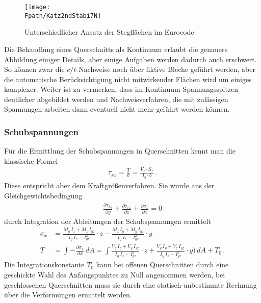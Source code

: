 \begin{figure}[tbp] \centering
\centering
\if {} \sidecaption[t] \fi
\texttt{[image: \\Fpath/Katz2ndStabi7N]}
\caption{Unterschiedlicher Ansatz der Stegfl\"{a}chen im Eurocode} \label{Katz2ndStabi7}
\end{figure}%
Die Behandlung eines Querschnitts als Kontinuum erlaubt die genauere Abbildung einiger Details, aber einige Aufgaben werden dadurch auch erschwert. So k\"{o}nnen zwar die $c/t$-Nachweise noch \"{u}ber fiktive Bleche gef\"{u}hrt werden, aber die automatische Ber\"{u}cksichtigung nicht mitwirkender Fl\"{a}chen wird um einiges komplexer. Weiter ist zu vermerken, dass im Kontinuum Spannungsspitzen deutlicher abgebildet werden und Nachweisverfahren, die mit zul\"{a}ssigen Spannungen arbeiten dann eventuell nicht mehr gef\"{u}hrt werden k\"{o}nnen.
\vspace{-0.5cm}
{\textcolor{sectionTitleBlue}{\subsubsection*{Schubspannungen }}}
F\"{u}r die Ermittlung der Schubspannungen in Querschnitten kennt man die klassische Formel
\begin{align}
\tau_{xz} = \frac{T}{b} = \frac{V_z \cdot S_z}{I_y \cdot b}\,.
\end{align}
Diese entspricht aber dem Kraftgr\"{o}{\ss}enverfahren. Sie wurde aus der Gleichgewichtsbedingung
\begin{align}
\frac{\partial \tau_{xy}}{\partial y} + \frac{\partial \tau_{xz}}{\partial z} + \frac{\partial \sigma_x}{\partial x} = 0
\end{align}
durch Integration der Ableitungen der Schubspannungen ermittelt
\begin{align}
\sigma_{x} &= \frac{M_y\,I_z + M_z\,I_{yz}}{I_y\,I_z - I_{yz}^2} \cdot z - \frac{M_z\,I_y + M_y\,I_{yz}}{I_y\,I_z - I_{yz}^2} \cdot y \\
T &= \int - \frac{ \partial \sigma_x}{\partial x}\,dA = \int\frac{V_z\,I_z + V_y\,I_{yz}}{I_y\,I_z - I_{yz}^2} \cdot z + \frac{V_y\,I_y + V_z\,I_{yz}}{I_y\,I_z - I_{yz}^2} \cdot y) \,dA + T_0\,.
\end{align}	
Die Integrationskonstante $T_0$ kann bei offenen Querschnitten durch eine geschickte Wahl des Anfangspunktes zu Null angenommen werden, bei geschlossenen Querschnitten muss sie durch eine statisch-unbestimmte Rechnung \"{u}ber die Verformungen ermittelt werden.
